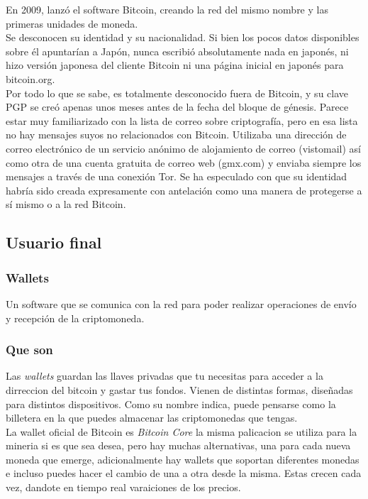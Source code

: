 \documentclass[12pt,letterpaper]{article}
\begin{document}
En 2009, lanz\'o el software Bitcoin, creando la red del mismo nombre y las primeras unidades de moneda.
\\

Se desconocen su identidad y su nacionalidad. Si bien los pocos datos disponibles sobre \'el apuntar\'ian a Jap\'on, nunca escribi\'o absolutamente nada en japon\'es, ni hizo versi\'on japonesa del cliente Bitcoin ni una p\'agina inicial en japon\'es para bitcoin.org.
\\

Por todo lo que se sabe, es totalmente desconocido fuera de Bitcoin, y su clave PGP se cre\'o apenas unos meses antes de la fecha del bloque de g\'enesis. Parece estar muy familiarizado con la lista de correo sobre criptograf\'ia, pero en esa lista no hay mensajes suyos no relacionados con Bitcoin. Utilizaba una direcci\'on de correo electr\'onico de un servicio an\'onimo de alojamiento de correo (vistomail) as\'i como otra de una cuenta gratuita de correo web (gmx.com) y enviaba siempre los mensajes a trav\'es de una conexi\'on Tor. Se ha especulado con que su identidad habr\'ia sido creada expresamente con antelaci\'on como una manera de protegerse a s\'i mismo o a la red Bitcoin. 

    \subsection*{Usuario final}

        \subsubsection*{Wallets}
Un software que se comunica con la red para poder realizar operaciones de env\'io y recepci\'on de la criptomoneda.

        \subsubsection*{Que son}
            Las \textit{wallets} guardan las llaves privadas que tu necesitas para acceder a la dirreccion del bitcoin y gastar tus fondos. Vienen de distintas formas, dise\~nadas para distintos dispositivos. Como su nombre indica, puede pensarse como la billetera en la que puedes almacenar las criptomonedas que tengas.
\\
                
            La wallet oficial de Bitcoin es \textit{Bitcoin Core} la misma palicacion se utiliza para la mineria si es que sea desea, pero hay muchas alternativas, una para cada nueva moneda que emerge, adicionalmente hay wallets que soportan diferentes monedas e incluso puedes hacer el cambio de una a otra desde la misma. Estas crecen cada vez, dandote en tiempo real varaiciones de los precios.
\end{document}
